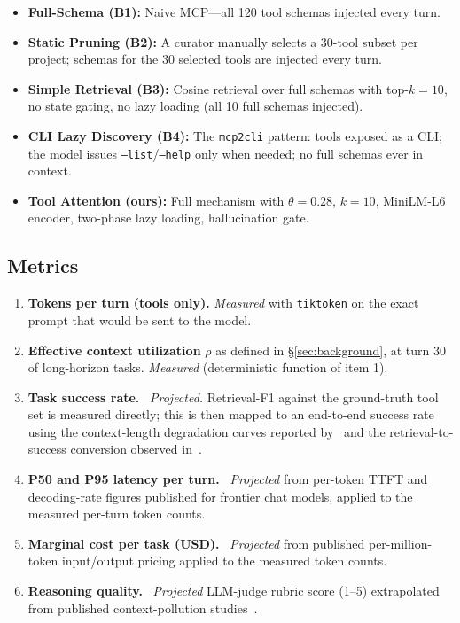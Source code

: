\documentclass[11pt]{article}
\begin{document}
\begin{itemize}
\item \textbf{Full-Schema (B1):} Naive MCP---all 120 tool schemas injected every turn.
\item \textbf{Static Pruning (B2):} A curator manually selects a 30-tool subset per project; schemas for the 30 selected tools are injected every turn.
\item \textbf{Simple Retrieval (B3):} Cosine retrieval over full schemas with top-$k=10$, no state gating, no lazy loading (all 10 full schemas injected).
\item \textbf{CLI Lazy Discovery (B4):} The \texttt{mcp2cli} pattern: tools exposed as a CLI; the model issues \texttt{--list}/\texttt{--help} only when needed; no full schemas ever in context.
\item \textbf{Tool Attention (ours):} Full mechanism with $\theta=0.28$, $k=10$, MiniLM-L6 encoder, two-phase lazy loading, hallucination gate.
\end{itemize}

\subsection{Metrics}

\begin{enumerate}
\item \textbf{Tokens per turn (tools only).} \emph{Measured} with \texttt{tiktoken} on the exact prompt that would be sent to the model.
\item \textbf{Effective context utilization} $\rho$ as defined in \S\ref{sec:background}, at turn 30 of long-horizon tasks. \emph{Measured} (deterministic function of item 1).
\item \textbf{Task success rate.} \dag~\emph{Projected.} Retrieval-F1 against the ground-truth tool set is measured directly; this is then mapped to an end-to-end success rate using the context-length degradation curves reported by~\citep{pan2026agent,modarressi2025nolima} and the retrieval-to-success conversion observed in~\citep{mindstudio2026claudecode}.
\item \textbf{P50 and P95 latency per turn.} \dag~\emph{Projected} from per-token TTFT and decoding-rate figures published for frontier chat models, applied to the measured per-turn token counts.
\item \textbf{Marginal cost per task (USD).} \dag~\emph{Projected} from published per-million-token input/output pricing applied to the measured token counts.
\item \textbf{Reasoning quality.} \dag~\emph{Projected} LLM-judge rubric score (1--5) extrapolated from published context-pollution studies~\citep{pan2026agent,modarressi2025nolima}.
\end{enumerate}
\end{document}

